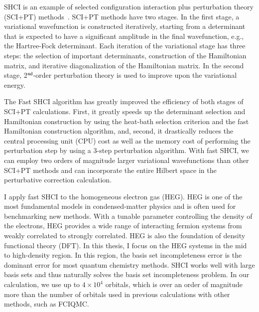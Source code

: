 \documentclass[phd,tocprelim]{cornell}
\begin{document}
SHCI is an example of selected configuration interaction plus perturbation theory (SCI+PT)
methods~\cite{HurMalRan-JCP-73,BuePey-TCA-74,EvaDauMal-CP-83,CimPer-JCoP-87,Har-JCP-91,BytRue-CP-09,KelPerBarGre-JCP-14,CoeMurPat-CPL-14,Eva-JCP-14,SceAppGinCaf-JCoC-16,GarSceLooCaf-JCP-17,LooSceBloGarCafJac-JCP-18,TubLevHaiHeaWha-ARX-18}.
SCI+PT methods have two stages.
In the first stage, a variational wavefunction is constructed iteratively, starting from
a determinant that is expected to have a significant amplitude in the final wavefunction, e.g., the Hartree-Fock determinant.
Each iteration of the variational stage has three steps: the selection of important determinants, construction of the Hamiltonian matrix, and
iterative diagonalization of the Hamiltonian matrix.
In the second stage, 2$^{\rm nd}$-order perturbation theory is used to improve upon the variational energy.

The Fast SHCI algorithm has greatly improved the efficiency of both stages of SCI+PT calculations.
First, it greatly speeds up the determinant selection and Hamiltonian construction by using the heat-bath selection criterion and the fast Hamiltonian construction algorithm, and, second, it drastically reduces the central processing unit (CPU) cost as well as the memory cost of performing the perturbation step by using a 3-step perturbation algorithm.
With fast SHCI, we can employ two orders of magnitude larger variational wavefunctions than other SCI+PT methods and can incorporate the entire Hilbert space in the perturbative correction calculation.

I apply fast SHCI to the homogeneous electron gas (HEG).
HEG is one of the most fundamental models in condensed-matter physics and is often used for benchmarking new methods.
With a tunable parameter controlling the density of the electrons, HEG provides a wide range of interacting fermion systems from weakly correlated to strongly correlated.
HEG is also the foundation of density functional theory (DFT).
In this thesis, I focus on the HEG systems in the mid to high-density region.
In this region, the basis set incompleteness error is the dominant error for most quantum chemistry methods.
SHCI works well with large basis sets and thus naturally solves the basis set incompleteness problem.
In our calculation, we use up to $4\times10^4$ orbitals, which is over an order of magnitude more than the number of orbitals used in previous calculations with other methods, such as FCIQMC.
\end{document}
